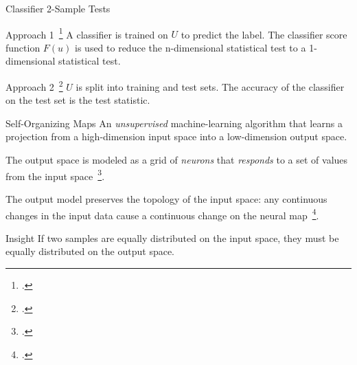 \documentclass[10pt]{beamer}
\begin{document}
\begin{frame}{Classifier 2-Sample Tests}
    \begin{block}{Approach 1~\footcite{friedman2004multivariate}}
        A classifier is trained on $U$ to predict the label. The classifier score function $F(u)$ is used
        to reduce the n-dimensional statistical test to a 1-dimensional statistical test.
    \end{block}
    \begin{block}{Approach 2~\footcite{lopez2016revisiting}}
        $U$ is split into training and test sets. The accuracy of the classifier on the test set is the test statistic.
    \end{block}

\end{frame}

\begin{frame}{Self-Organizing Maps}
    An \emph{unsupervised} machine-learning algorithm that learns
    a projection from a high-dimension input space into a low-dimension output space.

    \smallskip
    
    The output space is modeled as a grid of \emph{neurons} that \emph{responds} to a set of
    values from the input space~\footcite{kohonen1982self}.

    \smallskip
    
    \alert{The output model preserves the topology of the input space}: any continuous changes
    in the input data cause a continuous change on the neural map~\footcite{Villmann1999}.
    
    \begin{alertblock}{Insight}
        \smallskip
        If two samples are equally distributed on the input space, they must be equally distributed on the output space.
    \end{alertblock}    

\end{frame}
\end{document}
